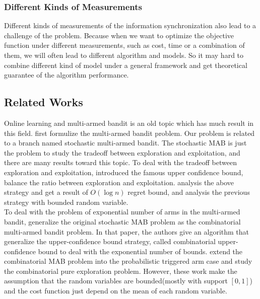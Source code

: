 \documentclass{article}
\theoremstyle{plain}
\theoremstyle{definition}
\theoremstyle{remark}
\begin{document}
    \subsubsection{Different Kinds of Measurements}
    Different kinds of measurements of the information synchronization also lead to a challenge of the problem. Because when we want to optimize the objective function under different measurements, such as cost, time or a combination of them, we will often lead to different algorithm and models. So it may hard to combine different kind of model under a general framework and get theoretical guarantee of the algorithm performance.

    \subsection{Related Works}
    Online learning and multi-armed bandit is an old topic which has much result in this field. \citet{Thompson:10.2307/2332286} first formulize the multi-armed bandit problem. Our problem is related to a branch named stochastic multi-armed bandit. The stochastic MAB is just the problem to study the tradeoff between exploration and exploitation, and there are many results toward this topic. To deal with the tradeoff between exploration and exploitation, \citet{Lai:1985:AEA:2609660.2609757} introduced the famous upper confidence bound, balance the ratio between exploration and exploitation. \citet{Agrawal1995} analysis the above strategy and get a result of $O(\log n)$ regret bound, and \citet{Auer:2002:FAM:599614.599677} analysis the previous strategy with bounded random variable.\\

    To deal with the problem of exponential number of arms in the multi-armed bandit, \citet{pmlr-v28-chen13a} generalize the original stochastic MAB problem as the combinatorial multi-armed bandit problem. In that paper, the authors give an algorithm that generalize the upper-confidence bound strategy, called combinatorial upper-confidence bound to deal with the exponential number of bounds. \citet{DBLP:journals/corr/ChenWY14a} extend the combinatorial MAB problem into the probabilistic triggered arm case and \citet{Chen:2014:CPE:2968826.2968869} study the combinatorial pure exploration problem. However, these work make the assumption that the random variables are bounded(mostly with support $[0,1]$) and the cost function just depend on the mean of each random variable.\\
\end{document}
